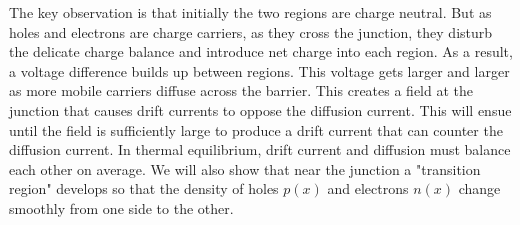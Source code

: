 The key observation is that initially the two regions are charge neutral.  But as holes and electrons are charge carriers, as they cross the junction, they disturb the delicate charge balance and introduce net charge into each region.  As a result, a voltage difference builds up between regions.  This voltage gets larger and larger as more mobile carriers diffuse across the barrier.   This creates a field at the junction that causes drift currents to oppose the diffusion current.  This will ensue until the field is sufficiently large to produce a drift current that can counter the diffusion current.  In thermal equilibrium, drift current and diffusion must balance each other on average.  We will also show that near the junction a "transition region" develops so that the density of holes $p(x)$ and electrons $n(x)$ change smoothly from one side to the other.
\newpage
